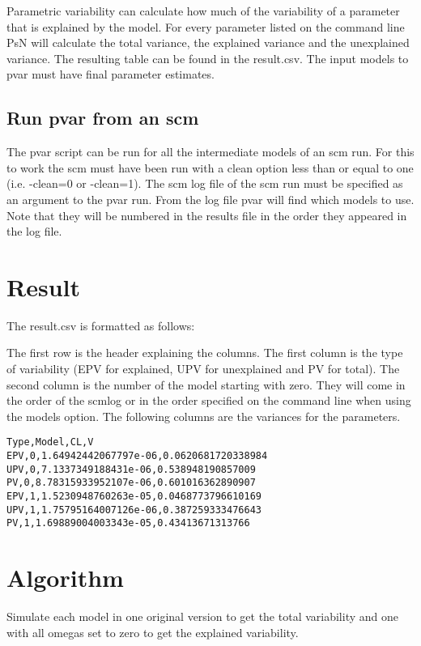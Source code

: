 Parametric variability can calculate how much of the variability of a parameter that is explained by the model. For every parameter listed on the command line PsN will calculate the total variance, the explained variance and the unexplained variance. The resulting table can be found in the result.csv. The input models to pvar must have final parameter estimates.

\subsection{Run pvar from an scm}
The pvar script can be run for all the intermediate models of an scm run. For this to work the scm must have been run with a clean option less than or equal to one (i.e. -clean=0 or -clean=1). The scm log file of the scm run must be specified as an argument to the pvar run. From the log file pvar will find which models to use. Note that they will be numbered in the results file in the order they appeared in the log file. 

\section{Result}

The result.csv is formatted as follows:

The first row is the header explaining the columns.
The first column is the type of variability (EPV for explained, UPV for unexplained and PV for total). The second column is the number of the model starting with zero. They will come in the order of the scmlog or in the order specified on the command line when using the models option. The following columns are the variances for the parameters.

\begin{verbatim}
Type,Model,CL,V
EPV,0,1.64942442067797e-06,0.0620681720338984
UPV,0,7.1337349188431e-06,0.538948190857009
PV,0,8.78315933952107e-06,0.601016362890907
EPV,1,1.5230948760263e-05,0.0468773796610169
UPV,1,1.75795164007126e-06,0.387259333476643
PV,1,1.69889004003343e-05,0.43413671313766
\end{verbatim}

\section{Algorithm}

Simulate each model in one original version to get the total variability and one with all omegas set to zero to get the explained variability.

